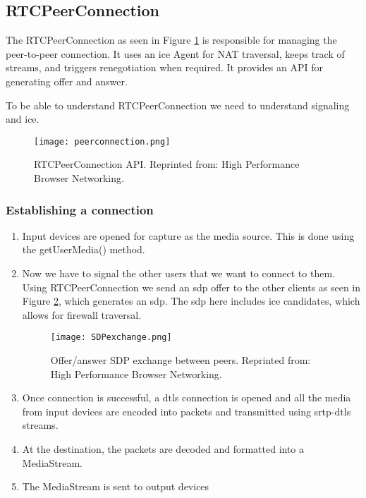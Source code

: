 \subsection{RTCPeerConnection}
The RTCPeerConnection as seen in Figure \ref{fig:rtcpeerconnection} is responsible for managing the peer-to-peer connection. It uses an \gls{ice} Agent for NAT traversal, keeps track of streams, and triggers renegotiation when required. It provides an API for generating offer and answer.

To be able to understand RTCPeerConnection we need to understand signaling and \gls{ice}.

\begin{figure}[here]
\centerline{\texttt{[image: peerconnection.png]}}
\caption{RTCPeerConnection API. Reprinted from: High Performance Browser Networking\cite{grigorik_high_2013}.}
\label{fig:rtcpeerconnection}
\end{figure}

\subsubsection{Establishing a connection}

\begin{enumerate}
\item Input devices are opened for capture as the media source. This is done using the getUserMedia() method.
\item Now we have to signal the other users that we want to connect to them. Using RTCPeerConnection we send an \gls{sdp} offer to the other clients as seen in Figure \ref{fig:sdp-exchange}, which generates an \gls{sdp}. The \gls{sdp} here includes \gls{ice} candidates,  which allows for firewall traversal.

\begin{figure}[here]
\centerline{\texttt{[image: SDPexchange.png]}}
\caption{Offer/answer SDP exchange between peers. Reprinted from: High Performance Browser Networking\cite{grigorik_high_2013}.}
\label{fig:sdp-exchange}
\end{figure}

\item Once connection is successful, a \gls{dtls} connection is opened and all the media from input devices are encoded into packets and transmitted using \gls{srtp}-\gls{dtls} streams.
\item At the destination, the packets are decoded and formatted into a MediaStream.
\item The MediaStream is sent to output devices
\end{enumerate}


